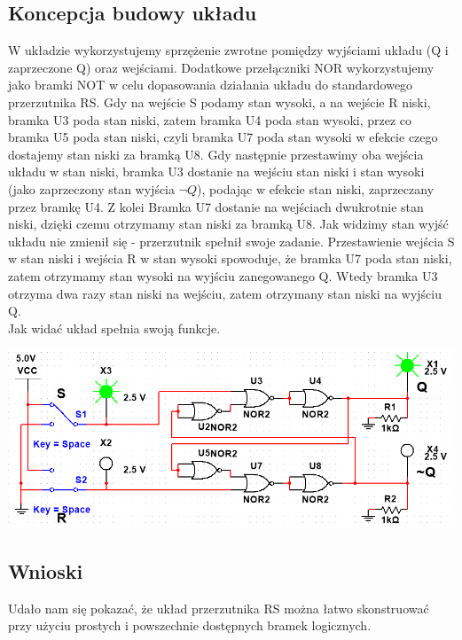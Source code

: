 \documentclass{article}
\begin{document}
        \subsection{Koncepcja budowy układu}
            W układzie wykorzystujemy sprzężenie zwrotne pomiędzy wyjściami układu (Q i zaprzeczone Q) oraz wejściami. Dodatkowe przełączniki NOR wykorzystujemy jako bramki NOT w celu dopasowania działania układu do standardowego przerzutnika RS. Gdy na wejście S podamy stan wysoki, a na wejście R niski, bramka U3 poda stan niski, zatem bramka U4 poda stan wysoki, przez co bramka U5 poda stan niski, czyli bramka U7 poda stan wysoki w efekcie czego dostajemy stan niski za bramką U8. Gdy następnie przestawimy oba wejścia układu w stan niski, bramka U3 dostanie na wejściu stan niski i stan wysoki (jako zaprzeczony stan wyjścia $\neg Q$), podając w efekcie stan niski, zaprzeczany przez bramkę U4. Z kolei Bramka U7 dostanie na wejściach dwukrotnie stan niski, dzięki czemu otrzymamy stan niski za bramką U8. Jak widzimy stan wyjść układu nie zmienił się - przerzutnik spełnił swoje zadanie. Przestawienie wejścia S w stan niski i wejścia R w stan wysoki spowoduje, że bramka U7 poda stan niski, zatem otrzymamy stan wysoki na wyjściu zanegowanego Q. Wtedy bramka U3 otrzyma dwa razy stan niski na wejściu, zatem otrzymany stan niski na wyjściu Q.\\ 
            Jak widać układ spełnia swoją funkcje.
            \begin{center}
                \includegraphics[width=18cm]{reports/img/Z2A_2.png}\\
            \end{center}

        \subsection{Wnioski}
            Udało nam się pokazać, że układ przerzutnika RS można łatwo skonstruować przy użyciu prostych i powszechnie dostępnych bramek logicznych. 
        
\end{document}
